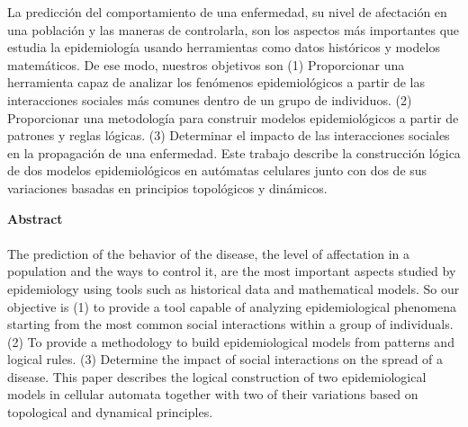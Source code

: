 
La predicción del comportamiento de una enfermedad, su nivel de afectación en una población y las maneras de controlarla, son los aspectos más importantes que estudia la epidemiología usando herramientas como datos históricos y modelos matemáticos.
De ese modo, nuestros objetivos son (1) Proporcionar una herramienta capaz de analizar los fenómenos epidemiológicos a partir de las interacciones sociales más comunes dentro de un grupo de individuos.
(2) Proporcionar una metodología para construir modelos epidemiológicos a partir de patrones y reglas lógicas. 
(3) Determinar el impacto de las interacciones sociales en la propagación de una enfermedad.
Este trabajo describe la construcción lógica de dos modelos epidemiológicos en autómatas celulares junto con dos de sus variaciones basadas en principios topológicos y dinámicos. 
$$$$

\textbf{\LARGE Abstract}\\\\


The prediction of the behavior of the disease, the level of affectation in a population and the ways to control it, are the most important aspects studied by epidemiology using tools such as historical data and mathematical models.
So our objective is (1) to provide a tool capable of analyzing epidemiological phenomena starting from the most common social interactions within a group of individuals.
(2) To provide a methodology to build epidemiological models from patterns and logical rules. 
(3) Determine the impact of social interactions on the spread of a disease.
This paper describes the logical construction of two epidemiological models in cellular automata together with two of their variations based on topological and dynamical principles.
